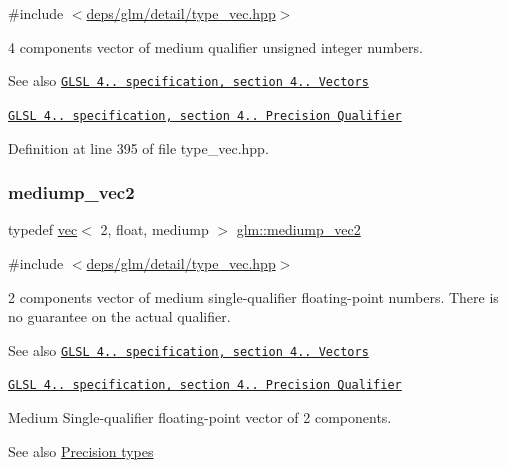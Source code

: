 {\ttfamily \#include $<$\hyperlink{type__vec_8hpp}{deps/glm/detail/type\+\_\+vec.\+hpp}$>$}

4 components vector of medium qualifier unsigned integer numbers.

\begin{DoxySeeAlso}{See also}
\href{http://www.opengl.org/registry/doc/GLSLangSpec.4.20.8.pdf}{\tt G\+L\+SL 4.. specification, section 4.. Vectors} 

\href{http://www.opengl.org/registry/doc/GLSLangSpec.4.20.8.pdf}{\tt G\+L\+SL 4.. specification, section 4.. Precision Qualifier} 
\end{DoxySeeAlso}


Definition at line 395 of file type\+\_\+vec.\+hpp.

\mbox{\label{group__core__precision_ga96e0011dd4d124d28fd52ef2f0c6f299}} 
\subsubsection{\texorpdfstring{mediump\+\_\+vec2}{mediump\_vec2}}
{\footnotesize\ttfamily typedef \hyperlink{structglm_1_1vec}{vec}$<$ 2, float, mediump $>$ \hyperlink{group__core__precision_ga96e0011dd4d124d28fd52ef2f0c6f299}{glm\+::mediump\+\_\+vec2}}



{\ttfamily \#include $<$\hyperlink{type__vec_8hpp}{deps/glm/detail/type\+\_\+vec.\+hpp}$>$}

2 components vector of medium single-\/qualifier floating-\/point numbers. There is no guarantee on the actual qualifier.

\begin{DoxySeeAlso}{See also}
\href{http://www.opengl.org/registry/doc/GLSLangSpec.4.20.8.pdf}{\tt G\+L\+SL 4.. specification, section 4.. Vectors} 

\href{http://www.opengl.org/registry/doc/GLSLangSpec.4.20.8.pdf}{\tt G\+L\+SL 4.. specification, section 4.. Precision Qualifier}
\end{DoxySeeAlso}
Medium Single-\/qualifier floating-\/point vector of 2 components. \begin{DoxySeeAlso}{See also}
\hyperlink{group__core__precision}{Precision types} 
\end{DoxySeeAlso}


